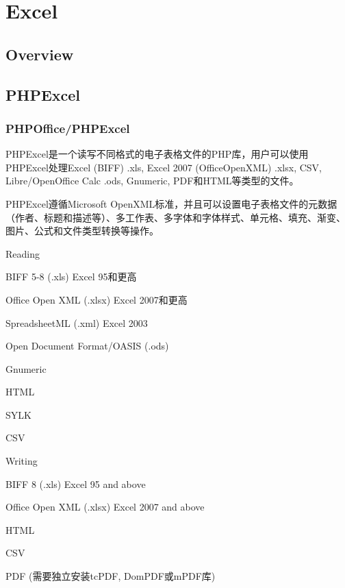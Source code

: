 \part{Excel}


\chapter{Overview}






\chapter{PHPExcel}



\section{PHPOffice/PHPExcel}


PHPExcel是一个读写不同格式的电子表格文件的PHP库，用户可以使用PHPExcel处理Excel (BIFF) .xls, Excel 2007 (OfficeOpenXML) .xlsx, CSV, Libre/OpenOffice Calc .ods, Gnumeric, PDF和HTML等类型的文件。

PHPExcel遵循Microsoft OpenXML标准，并且可以设置电子表格文件的元数据（作者、标题和描述等）、多工作表、多字体和字体样式、单元格、填充、渐变、图片、公式和文件类型转换等操作。



\begin{compactenum}
\item Reading

\begin{compactitem}
\item BIFF 5-8 (.xls) Excel 95和更高
\item Office Open XML (.xlsx) Excel 2007和更高
\item SpreadsheetML (.xml) Excel 2003
\item Open Document Format/OASIS (.ods)
\item Gnumeric
\item HTML
\item SYLK
\item CSV
\end{compactitem}

\item Writing

\begin{compactitem}
\item BIFF 8 (.xls) Excel 95 and above
\item Office Open XML (.xlsx) Excel 2007 and above
\item HTML
\item CSV
\item PDF (需要独立安装tcPDF, DomPDF或mPDF库)
\end{compactitem}

\end{compactenum}



